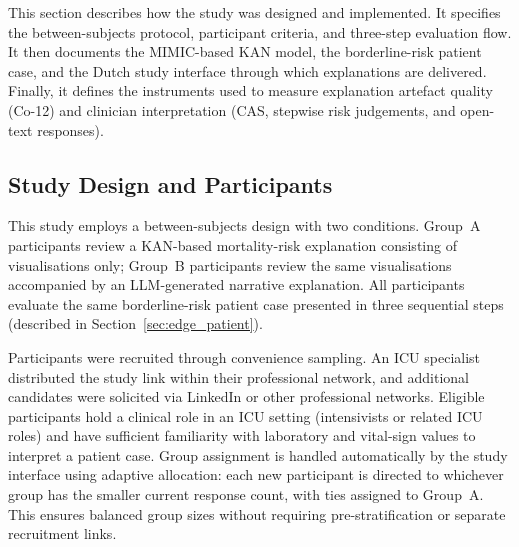 \documentclass[12pt, a4paper]{article}
\begin{document}
This section describes how the study was designed and implemented.
It specifies the between-subjects protocol, participant criteria, and
three-step evaluation flow.
It then documents the MIMIC-based KAN model, the borderline-risk patient
case, and the Dutch study interface through which explanations are delivered.
Finally, it defines the instruments used to measure explanation artefact
quality (Co-12) and clinician interpretation (CAS, stepwise risk judgements,
and open-text responses).

\subsection{Study Design and Participants}
\label{sec:study_design}

This study employs a between-subjects design with two conditions.
Group~A participants review a KAN-based mortality-risk explanation
consisting of visualisations only; Group~B participants review the same
visualisations accompanied by an LLM-generated narrative explanation.
All participants evaluate the same borderline-risk patient case
presented in three sequential steps (described in
Section~\ref{sec:edge_patient}).

Participants were recruited through convenience sampling.
An ICU specialist distributed the study link within their professional
network, and additional candidates were solicited via LinkedIn or other professional networks.
Eligible participants hold a clinical role in an ICU setting
(intensivists or related ICU roles) and have sufficient familiarity
with laboratory and vital-sign values to interpret a patient
case. 
Group assignment is handled automatically by the study interface using
adaptive allocation: each new participant is directed to whichever group
has the smaller current response count, with ties assigned to Group~A.
This ensures balanced group sizes without requiring pre-stratification
or separate recruitment links.
\end{document}
